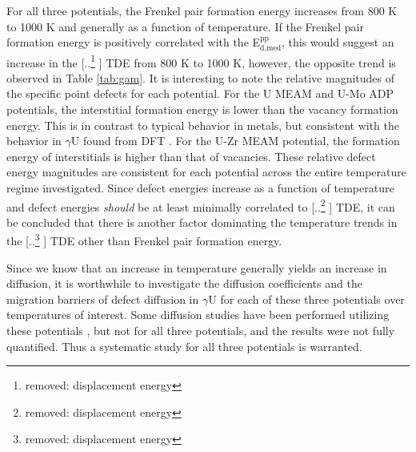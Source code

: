 \documentclass[review]{elsarticle}
\providecommand{\DIFaddtex}[1]{{\protect\color{blue} \sf #1}} %
\providecommand{\DIFdeltex}[1]{{\protect\color{red} [..\footnote{removed: #1} ]}} %
\providecommand{\DIFaddbegin}{} %
\providecommand{\DIFaddend}{} %
\providecommand{\DIFdelbegin}{} %
\providecommand{\DIFdelend}{} %
\providecommand{\DIFadd}[1]{\texorpdfstring{\DIFaddtex{#1}}{#1}} %
\providecommand{\DIFdel}[1]{\texorpdfstring{\DIFdeltex{#1}}{}} %
\newcommand{\DIFscaledelfig}{0.5}
\newlength{\DIFdelgraphicswidth} %
\newlength{\DIFdelgraphicsheight} %
\newcommand{\DIFaddincludegraphics}[2][]{{\color{blue}\fbox{\DIFOincludegraphics[#1]{#2}}}} %
\newcommand{\DIFdelincludegraphics}[2][]{%
\sbox{\DIFdelgraphicsbox}{\DIFOincludegraphics[#1]{#2}}%
\settoboxwidth{\DIFdelgraphicswidth}{\DIFdelgraphicsbox} %
\settoboxtotalheight{\DIFdelgraphicsheight}{\DIFdelgraphicsbox} %
\scalebox{\DIFscaledelfig}{%
\parbox[b]{\DIFdelgraphicswidth}{\usebox{\DIFdelgraphicsbox}\\[-\baselineskip] \rule{\DIFdelgraphicswidth}{0em}}\llap{\resizebox{\DIFdelgraphicswidth}{\DIFdelgraphicsheight}{%
\setlength{\unitlength}{\DIFdelgraphicswidth}%
\begin{picture}(1,1)%
\thicklines\linethickness{2pt} %
{\color[rgb]{1,0,0}\put(0,0){\framebox(1,1){}}}%
{\color[rgb]{1,0,0}\put(0,0){\line( 1,1){1}}}%
{\color[rgb]{1,0,0}\put(0,1){\line(1,-1){1}}}%
\end{picture}%
}\hspace*{3pt}}} %
} %
\DeclareRobustCommand{\DIFaddbegin}{\DIFOaddbegin \let\includegraphics\DIFaddincludegraphics} %
\DeclareRobustCommand{\DIFaddend}{\DIFOaddend \let\includegraphics\DIFOincludegraphics} %
\DeclareRobustCommand{\DIFdelbegin}{\DIFOdelbegin \let\includegraphics\DIFdelincludegraphics} %
\DeclareRobustCommand{\DIFdelend}{\DIFOaddend \let\includegraphics\DIFOincludegraphics} %
\begin{document}
For all three potentials, the Frenkel pair formation energy increases from 800 K to 1000 K and generally as a function of temperature. If the Frenkel pair formation energy is positively correlated with the E$^{\textrm{pp}}_{\textrm{d,med}}$, this would suggest an increase in the \DIFdelbegin \DIFdel{displacement energy }\DIFdelend \DIFaddbegin \DIFadd{TDE }\DIFaddend from 800 K to 1000 K, however, the opposite trend is observed in Table \ref{tab:gam}. It is interesting to note the relative magnitudes of the specific point defects for each potential. For the U MEAM and U-Mo ADP potentials, the interstitial formation energy is lower than the vacancy formation energy. This is in contrast to typical behavior in metals, but consistent with the behavior in $\gamma$U found from DFT \cite{beeler2010}. For the U-Zr MEAM potential, the formation energy of interstitials is higher than that of vacancies. These relative defect energy magnitudes are consistent for each potential across the entire temperature regime investigated. Since defect energies increase as a function of temperature and defect energies \textit{should} be at least minimally correlated to \DIFdelbegin \DIFdel{displacement energy}\DIFdelend \DIFaddbegin \DIFadd{TDE}\DIFaddend , it can be concluded that there is another factor dominating the temperature trends in the \DIFdelbegin \DIFdel{displacement energy }\DIFdelend \DIFaddbegin \DIFadd{TDE }\DIFaddend other than Frenkel pair formation energy.

\FloatBarrier

Since we know that an increase in temperature generally yields an increase in diffusion, it is worthwhile to investigate the diffusion coefficients and the migration barriers of defect diffusion in $\gamma$U for each of these three potentials over temperatures of interest. Some diffusion studies have been performed utilizing these potentials \cite{smirnovaADP, smirnova2015}, but not for all three potentials, and the results were not fully quantified. Thus a systematic study for all three potentials is warranted.
\end{document}
